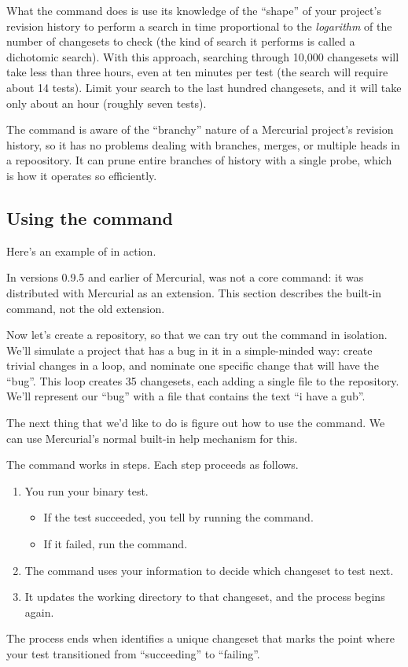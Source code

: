 What the  command does is use its knowledge of the
``shape'' of your project's revision history to perform a search in
time proportional to the \emph{logarithm} of the number of changesets
to check (the kind of search it performs is called a dichotomic
search).  With this approach, searching through 10,000 changesets will
take less than three hours, even at ten minutes per test (the search
will require about 14 tests).  Limit your search to the last hundred
changesets, and it will take only about an hour (roughly seven tests).

The  command is aware of the ``branchy'' nature of a
Mercurial project's revision history, so it has no problems dealing
with branches, merges, or multiple heads in a repoository.  It can
prune entire branches of history with a single probe, which is how it
operates so efficiently.

\subsection{Using the  command}

Here's an example of  in action.

\begin{note}
  In versions 0.9.5 and earlier of Mercurial,  was not a
  core command: it was distributed with Mercurial as an extension.
  This section describes the built-in command, not the old extension.
\end{note}

Now let's create a repository, so that we can try out the
 command in isolation.
We'll simulate a project that has a bug in it in a simple-minded way:
create trivial changes in a loop, and nominate one specific change
that will have the ``bug''.  This loop creates 35 changesets, each
adding a single file to the repository.  We'll represent our ``bug''
with a file that contains the text ``i have a gub''.

The next thing that we'd like to do is figure out how to use the
 command.  We can use Mercurial's normal built-in help
mechanism for this.

The  command works in steps.  Each step proceeds as follows.
\begin{enumerate}
\item You run your binary test.
  \begin{itemize}
  \item If the test succeeded, you tell  by running the
     command.
  \item If it failed, run the  command.
  \end{itemize}
\item The command uses your information to decide which changeset to
  test next.
\item It updates the working directory to that changeset, and the
  process begins again.
\end{enumerate}
The process ends when  identifies a unique changeset
that marks the point where your test transitioned from ``succeeding''
to ``failing''.

